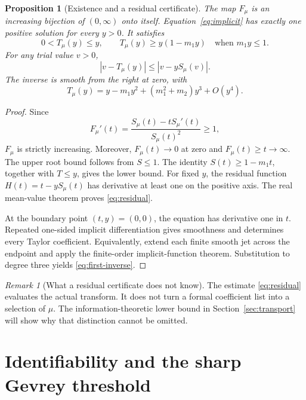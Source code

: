 \documentclass[11pt,a4paper]{article}
\numberwithin{equation}{section}
\newtheorem{proposition}[theorem]{Proposition}
\theoremstyle{definition}
\theoremstyle{remark}
\newtheorem{remark}[theorem]{Remark}
\begin{document}
\begin{proposition}[Existence and a residual certificate]
\label{prop:inverse}
The map \(F_\mu\) is an increasing bijection of \((0,\infty)\) onto itself.
Equation~\eqref{eq:implicit} has exactly one positive solution for every
\(y>0\). It satisfies
\begin{equation}
 0<T_\mu(y)\le y,
 \qquad T_\mu(y)\ge y(1-m_1y)
 \quad\text{when }m_1y\le1.
 \label{eq:root-bounds}
\end{equation}
For any trial value \(v>0\),
\begin{equation}
 |v-T_\mu(y)|\le|v-yS_\mu(v)|.
 \label{eq:residual}
\end{equation}
The inverse is smooth from the right at zero, with
\begin{equation}
 T_\mu(y)=y-m_1y^2+(m_1^2+m_2)y^3+O(y^4).
 \label{eq:first-inverse}
\end{equation}
\end{proposition}
\begin{proof}
Since
\[
 F_\mu'(t)=\frac{S_\mu(t)-tS_\mu'(t)}{S_\mu(t)^2}\ge1,
\]
\(F_\mu\) is strictly increasing. Moreover, \(F_\mu(t)\to0\) at zero and
\(F_\mu(t)\ge t\to\infty\). The upper root bound follows from \(S\le1\).
The identity \(S(t)\ge1-m_1t\), together with \(T\le y\), gives the lower
bound. For fixed \(y\), the residual function
\(H(t)=t-yS_\mu(t)\) has derivative at least one on the positive axis.
The real mean-value theorem proves \eqref{eq:residual}.

At the boundary point \((t,y)=(0,0)\), the equation has derivative one
in \(t\). Repeated one-sided implicit differentiation gives smoothness
and determines every Taylor coefficient. Equivalently, extend each
finite smooth jet across the endpoint and apply the finite-order
implicit-function theorem. Substitution to degree three yields
\eqref{eq:first-inverse}.
\end{proof}

\begin{remark}[What a residual certificate does not know]
The estimate \eqref{eq:residual} evaluates the actual transform. It does
not turn a formal coefficient list into a selection of \(\mu\).
The information-theoretic lower bound in Section~\ref{sec:transport}
will show why that distinction cannot be omitted.
\end{remark}

\section{Identifiability and the sharp Gevrey threshold}
\label{sec:threshold}
\end{document}
